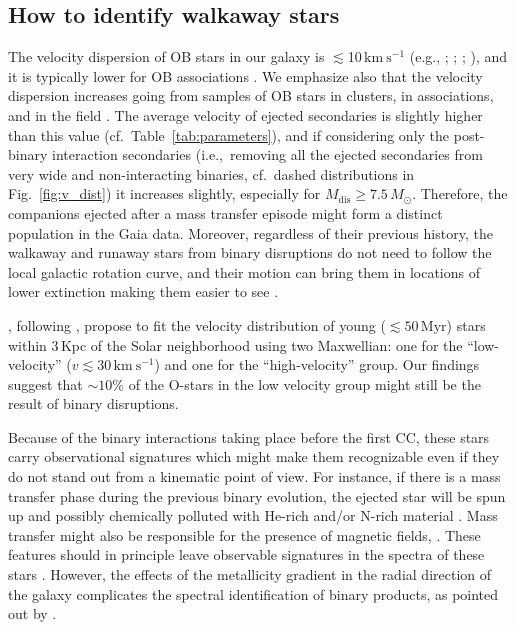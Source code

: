\documentclass{aa}
\DeclareRobustCommand{\Figref}[1]{Fig.~\ref{#1}}
\DeclareRobustCommand{\Tabref}[1]{Table~\ref{#1}}
\begin{document}
\subsection{How to identify walkaway stars}

The velocity dispersion of OB stars in our galaxy is
$\lesssim$10\,$\mathrm{km\ s^{-1}}$ (e.g.,
\citealt{blaauw:56}; \citealt{gies:87}; ;
\citealt{hoogerwerf:01}), and it is typically lower for OB
associations 
\citep[][]{debruijne:99,steenbrugge:03, kiminki:18}. We emphasize also that the velocity dispersion
increases going from samples of OB stars in clusters, in associations,
and in the field \citep[][]{gies:87}. The average velocity of ejected
secondaries is slightly higher than this value
(cf.~\Tabref{tab:parameters}), and if considering only the
post-binary interaction secondaries (i.e.,~removing all the ejected
secondaries from very wide and non-interacting binaries, cf.~dashed
distributions in \Figref{fig:v_dist}) it increases slightly,
especially for $M_\mathrm{dis}\geq7.5\,M_\odot$. Therefore, the
companions ejected after a mass transfer episode might form a distinct
population in the Gaia data. Moreover, regardless of their previous history, the walkaway
and runaway stars from binary disruptions do not need to follow the
local galactic rotation curve, and their motion can bring them in
locations of lower extinction making them easier to see
\citep[e.g.,][]{boubert:18,maiz-appellaniz:18}. 

\citet{tetzlaff:11}, following \cite{stone:91}, propose to fit the
velocity distribution of young ($\lesssim50\,\mathrm{Myr}$) stars
within 3\,Kpc of the Solar neighborhood using
two Maxwellian: one for the ``low-velocity'' ($v\lesssim30\,\mathrm{km\
  s^{-1}}$) and one for the ``high-velocity'' group. Our findings
suggest that $\sim$$10\%$ of the O-stars in the low velocity group might still be the
result of binary disruptions.

Because of the binary interactions taking
place before the first CC, these stars carry observational signatures which might
make them recognizable even if they do not stand out from a kinematic
point of view. For instance, if there is a mass transfer phase during
the previous binary evolution, the ejected star will be spun up
\citep[e.g.,][]{packet:81, pols:91,boubert:18} and
possibly chemically polluted with He-rich and/or N-rich material \citep[e.g.,][]{blaauw:93}. Mass transfer
might also be responsible for the presence of magnetic fields,
\citep[e.g.][]{schneider:16}. These features should in principle leave
observable signatures in the spectra of these stars \citep[e.g.,][]{maiz-appellaniz:18}. However, the
effects of the metallicity gradient in the radial direction of the
galaxy complicates the spectral identification of binary products, as pointed out by \cite{mcevoy:17}.
\end{document}
